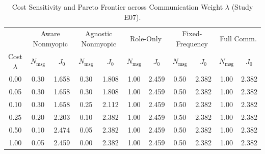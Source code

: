 \begin{table}[t]
\centering
\small
\caption{Cost Sensitivity and Pareto Frontier across Communication Weight $\lambda$ (Study E07).}
\label{tab:cost_frontier}
\begin{tabular}{ccccccccccc}
\toprule
& \multicolumn{2}{c}{Aware Nonmyopic} & \multicolumn{2}{c}{Agnostic Nonmyopic} & \multicolumn{2}{c}{Role-Only} & \multicolumn{2}{c}{Fixed-Frequency} & \multicolumn{2}{c}{Full Comm.} \\
\cmidrule(lr){2-3} \cmidrule(lr){4-5} \cmidrule(lr){6-7} \cmidrule(lr){8-9} \cmidrule(lr){10-11}
Cost $\lambda$ & $N_{\mathrm{msg}}$ & $J_0$ & $N_{\mathrm{msg}}$ & $J_0$ & $N_{\mathrm{msg}}$ & $J_0$ & $N_{\mathrm{msg}}$ & $J_0$ & $N_{\mathrm{msg}}$ & $J_0$ \\
\midrule
0.00 & 0.30 & 1.658 & 0.30 & 1.808 & 1.00 & 2.459 & 0.50 & 2.382 & 1.00 & 2.382 \\
0.05 & 0.30 & 1.658 & 0.30 & 1.808 & 1.00 & 2.459 & 0.50 & 2.382 & 1.00 & 2.382 \\
0.10 & 0.30 & 1.658 & 0.25 & 2.112 & 1.00 & 2.459 & 0.50 & 2.382 & 1.00 & 2.382 \\
0.25 & 0.20 & 2.203 & 0.10 & 2.382 & 1.00 & 2.459 & 0.50 & 2.382 & 1.00 & 2.382 \\
0.50 & 0.10 & 2.474 & 0.05 & 2.382 & 1.00 & 2.459 & 0.50 & 2.382 & 1.00 & 2.382 \\
1.00 & 0.05 & 2.459 & 0.00 & 2.382 & 1.00 & 2.459 & 0.50 & 2.382 & 1.00 & 2.382 \\
\bottomrule
\end{tabular}
\end{table}
